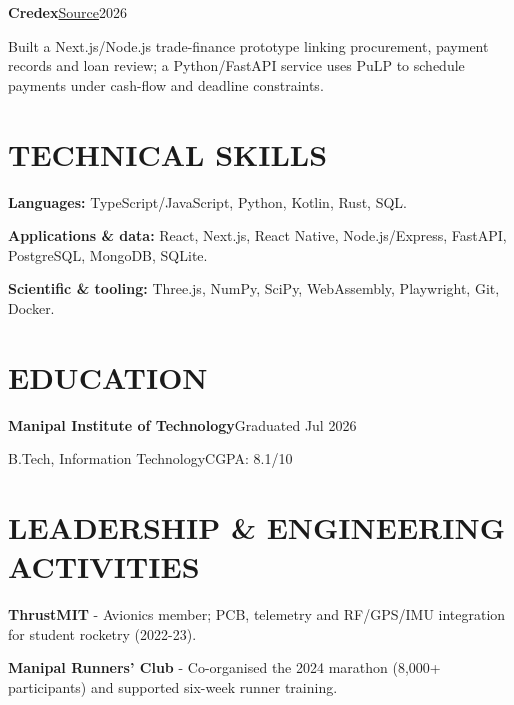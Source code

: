 \documentclass[a4paper,10pt]{article}
\newcommand{\project}[4]{%
  \textbf{#1}\hspace{6pt}\href{#3}{{\fontsize{9}{11}\selectfont Source}}\hfill{\fontsize{9}{11}\selectfont\color{muted}#2}\par
  #4\par\vspace{4pt}
}
\begin{document}
\project{Credex}{2026}{https://github.com/aniruddhballal/Credex}{%
Built a Next.js/Node.js trade-finance prototype linking procurement, payment records and loan review; a Python/FastAPI service uses PuLP to schedule payments under cash-flow and deadline constraints.}

\section{TECHNICAL SKILLS}
\textbf{Languages:} TypeScript/JavaScript, Python, Kotlin, Rust, SQL.\par
\textbf{Applications \& data:} React, Next.js, React Native, Node.js/Express, FastAPI, PostgreSQL, MongoDB, SQLite.\par
\textbf{Scientific \& tooling:} Three.js, NumPy, SciPy, WebAssembly, Playwright, Git, Docker.

\section{EDUCATION}
\textbf{Manipal Institute of Technology}\hfill{\fontsize{9}{11}\selectfont\color{muted}Graduated Jul 2026}\par
B.Tech, Information Technology\enspace\textbar\enspace CGPA: 8.1/10

\section{LEADERSHIP \& ENGINEERING ACTIVITIES}
\textbf{ThrustMIT} - Avionics member; PCB, telemetry and RF/GPS/IMU integration for student rocketry (2022-23).\par
\textbf{Manipal Runners' Club} - Co-organised the 2024 marathon (8,000+ participants) and supported six-week runner training.
\end{document}
